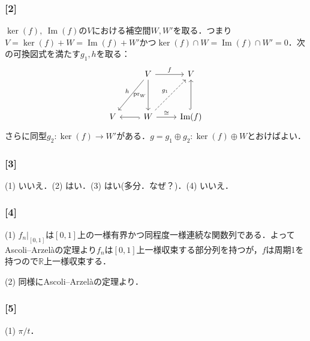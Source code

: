 \documentclass[a4j]{ltjsarticle}
\newcommand{\Rset}{\mathbb{R}}
\newcommand{\1}{\mathbbm{1}}
\numberwithin{equation}{section}
\theoremstyle{definition}
\begin{document}
\subsubsection*{[2]}
$\ker(f),\ \mathop{\mathrm{Im}}(f)$の$V$における補空間$W,W'$を取る．つまり$V=\ker(f)+ W=\mathop{\mathrm{Im}}(f)+W'$かつ$\ker (f) \cap W=\mathop{\mathrm{Im}}(f)\cap W'=0$．次の可換図式を満たす$g_1,h$を取る：
\begin{equation}
    \begin{tikzcd}
      & V \arrow[dd, "\mathop{\mathrm{pr}}_{W}"'] \arrow[ldd, "h"'] \arrow[r, "f"] & V                                        \\
      &                                                                            &                                          \\
    V & W \arrow[l, hook] \arrow[r, "\cong"] \arrow[ruu, "g_1", dashed]            & \mathop{\mathrm{Im}}(f) \arrow[uu, hook]
    \end{tikzcd}
\end{equation}
さらに同型$g_2\colon \ker(f)\to W'$がある．$g=g_1\oplus g_2\colon \ker(f)\oplus W$とおけばよい．
\subsubsection*{[3]}\label{am_2022_3}
(1) いいえ．(2) はい．(3) はい(多分．なぜ？)．(4) いいえ．

\subsubsection*{[4]}
(1) $f_{n}|_{[0,1]}$は$[0,1]$上の一様有界かつ同程度一様連続な関数列である．よってAscoli--Arzelàの定理より$f_n$は$[0,1]$上一様収束する部分列を持つが，$f$は周期1を持つので$\Rset$上一様収束する．

(2) 同様にAscoli--Arzelàの定理より．

\subsubsection*{[5]}
(1) $\pi/t$．
\end{document}
